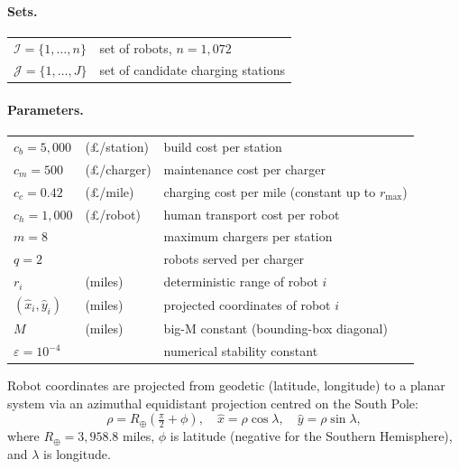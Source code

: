 \documentclass[11pt,a4paper]{article}
\begin{document}
\paragraph{Sets.}
\begin{tabular}{@{}ll@{}}
$\mathcal{I} = \{1,\dots,n\}$ & set of robots, $n = 1{,}072$ \\
$\mathcal{J} = \{1,\dots,J\}$ & set of candidate charging stations
\end{tabular}

\medskip
\paragraph{Parameters.}
\begin{tabular}{@{}lll@{}}
$c_b = 5{,}000$   & (\pounds/station)  & build cost per station \\
$c_m = 500$        & (\pounds/charger)  & maintenance cost per charger \\
$c_c = 0.42$       & (\pounds/mile)     & charging cost per mile (constant up to $r_{\max}$) \\
$c_h = 1{,}000$    & (\pounds/robot)    & human transport cost per robot \\
$m = 8$            &                    & maximum chargers per station \\
$q = 2$            &                    & robots served per charger \\
$r_i$              & (miles)            & deterministic range of robot $i$ \\
$(\hat{x}_i, \hat{y}_i)$ & (miles)     & projected coordinates of robot $i$ \\
$M$                & (miles)            & big-M constant (bounding-box diagonal) \\
$\varepsilon = 10^{-4}$ &              & numerical stability constant
\end{tabular}

\medskip
\noindent
Robot coordinates are projected from geodetic (latitude, longitude) to a planar system via an azimuthal equidistant projection centred on the South Pole:
\begin{equation}\label{eq:proj}
  \rho = R_\oplus \!\left(\tfrac{\pi}{2} + \phi\right), \quad
  \hat{x} = \rho \cos\lambda, \quad
  \hat{y} = \rho \sin\lambda,
\end{equation}
where $R_\oplus = 3{,}958.8$ miles, $\phi$ is latitude (negative for the Southern Hemisphere), and $\lambda$ is longitude.

\medskip
\end{document}

